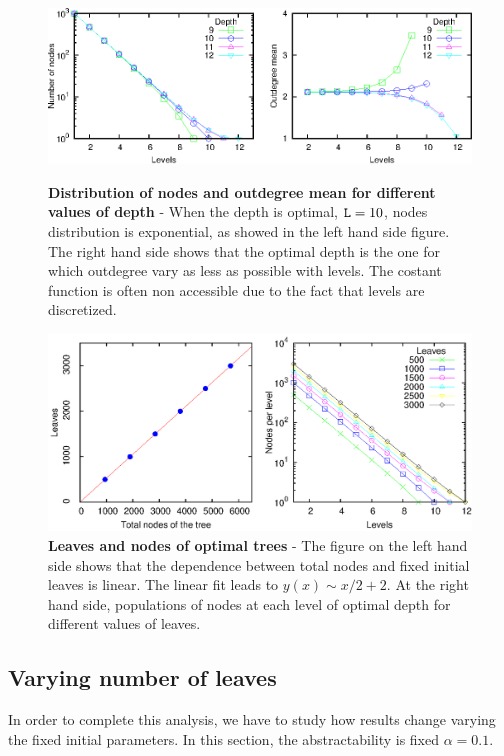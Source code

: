 \begin{figure}[p]%
\includegraphics[width=\textwidth,draft=false]{grafici/Mdepth.eps}
\caption{\label{FpopVSlevdepth} \footnotesize\textbf{Distribution of nodes and outdegree mean for different values of depth} - When the depth is optimal, $\mathtt L=10$, nodes distribution is exponential, as showed in the left hand side figure. The right hand side shows that the optimal depth is the one for which outdegree vary as less as possible with levels. The costant function is often non accessible due to the fact that levels are discretized.}
\vspace{1cm}
\includegraphics[width=\textwidth,draft=false]{grafici/Mnodes.eps}%
\caption{\label{FleaVSnod} \footnotesize\textbf{Leaves and nodes of optimal trees} - The figure on the left hand side shows that the dependence between total nodes and fixed initial leaves is linear. The linear fit leads to $y(x) \sim x/2 + 2$. At the right hand side, populations of nodes at each level of optimal depth for different values of leaves.}
\end{figure}

\subsection{Varying number of leaves}
In order to complete this analysis, we have to study how results change varying the fixed initial parameters.  In this section, the abstractability is fixed $\alpha=0.1$.

